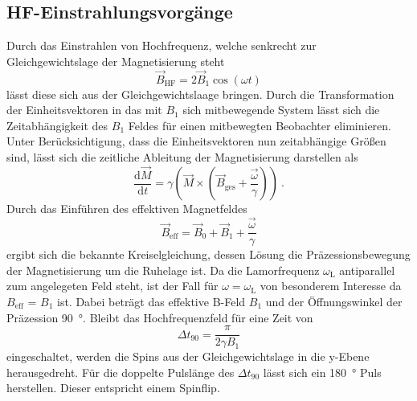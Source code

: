 \subsection{HF-Einstrahlungsvorgänge}%
\label{sub:hf_einstrahlungsvorgaenge}
Durch das Einstrahlen von Hochfrequenz, welche senkrecht zur Gleichgewichtslage
der Magnetisierung steht 
\begin{equation}
		\label{eq:bhf}
		\vec{B}_\text{HF} = 2 \vec{B}_1 \cos(\omega t)
\end{equation}
lässt diese sich aus der Gleichgewichtslaage bringen. 
Durch die Transformation der Einheitsvektoren in das mit $B_1$ sich mitbewegende
System lässt sich die Zeitabhängigkeit des $B_1$ Feldes für einen mitbewegten
Beobachter eliminieren. 
Unter Berücksichtigung, dass die Einheitsvektoren nun zeitabhängige Größen sind,
lässt sich die zeitliche Ableitung der Magnetisierung darstellen als 
\begin{equation}
		\label{eq:moment}
		\frac{\text{d}\vec{M}}{\text{d} t} = \gamma \left( \vec{M} \times \left(
		\vec{B}_\text{ges} + \frac{\vec{\omega}}{\gamma} \right) \right) \ .
\end{equation}
Durch das Einführen des effektiven Magnetfeldes 
\begin{equation}
		\label{eq:sumB}
		\vec{B}_\text{eff} = \vec{B}_0 + \vec{B}_1 + \frac{\vec{\omega}}{\gamma}
\end{equation}
ergibt sich die bekannte Kreiselgleichung, dessen Lösung die
Präzessionsbewegung der Magnetisierung um die Ruhelage ist. 
Da die Lamorfrequenz $\omega_\text{L}$ antiparallel zum angelegeten Feld steht,
ist der Fall für $\omega = \omega_\text{L}$ von besonderem Interesse da
$B_\text{eff}$ = $B_1$ ist.
Dabei beträgt das effektive B-Feld $B_1$ und der Öffnungswinkel der
Präzession \SI{90}{\degree}. 
Bleibt das Hochfrequenzfeld für eine Zeit von 
\begin{equation}
		\label{eq:90kick}
		\Delta t_{90} = \frac{\pi}{2 \gamma B_1}
\end{equation}
eingeschaltet, werden die Spins aus der Gleichgewichtslage in die y-Ebene
herausgedreht. 
Für die doppelte Pulslänge des $\Delta t_{90}$ lässt sich ein \SI{180}{\degree}
Puls herstellen.
Dieser entspricht einem Spinflip. 


